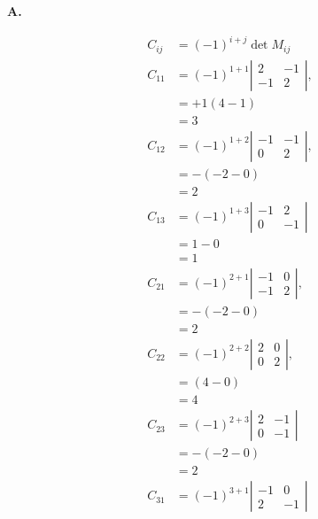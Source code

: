 \documentclass[main.tex]{subfiles}
\begin{document}
\begin{enumerate}
    \textbf{A.}
    
    $$
    \begin{aligned}
    C_{i j} &= (-1)^{i+j} \operatorname{det} M_{i j}\\
    C_{11} &=(-1)^{1+1}\left|\begin{array}{rr}
    2 & -1 \\
    -1 & 2
    \end{array}\right|, \\
    &=+1(4-1) \\
    &=3 \\
    C_{12} &=(-1)^{1+2}\left|\begin{array}{rr}
    -1 & -1 \\
    0 & 2
    \end{array}\right|, \\
    &=-(-2-0) \\
    &=2 \\
    C_{13} &=(-1)^{1+3}\left|\begin{array}{rr}
    -1 & 2 \\
    0 & -1
    \end{array}\right| \\
    &=1-0 \\
    &=1 \\
    C_{21} &=(-1)^{2+1}\left|\begin{array}{ll}
    -1 & 0 \\
    -1 & 2
    \end{array}\right|, \\
    &=-(-2-0) \\
    &=2 \\
    C_{22} &=(-1)^{2+2}\left|\begin{array}{ll}
    2 & 0 \\
    0 & 2
    \end{array}\right|, \\
    &=(4-0) \\
    &=4 \\
    C_{23} &=(-1)^{2+3}\left|\begin{array}{rr}
    2 & -1 \\
    0 & -1
    \end{array}\right| \\
    &=-(-2-0) \\
    &=2 \\
    C_{31} &=(-1)^{3+1}\left|\begin{array}{cc}
    -1 & 0 \\
    2 & -1
    \end{array}\right| \\

\end{aligned}$$
\end{enumerate}
\end{document}
